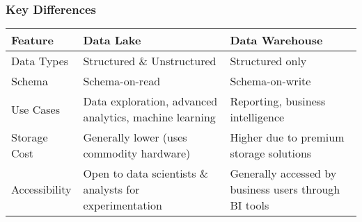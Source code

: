 \documentclass[aspectratio=169]{beamer}
\begin{document}
\begin{frame}[fragile]
    \frametitle{Key Differences}

    \begin{center}
        \begin{tabular}{|l|l|l|}
        \hline
        \textbf{Feature} & \textbf{Data Lake} & \textbf{Data Warehouse} \\
        \hline
        Data Types & Structured \& Unstructured & Structured only \\
        \hline
        Schema & Schema-on-read & Schema-on-write \\
        \hline
        Use Cases & Data exploration, advanced analytics, machine learning & Reporting, business intelligence \\
        \hline
        Storage Cost & Generally lower (uses commodity hardware) & Higher due to premium storage solutions \\
        \hline
        Accessibility & Open to data scientists \& analysts for experimentation & Generally accessed by business users through BI tools \\
        \hline
        \end{tabular}
    \end{center}
\end{frame}
\end{document}
